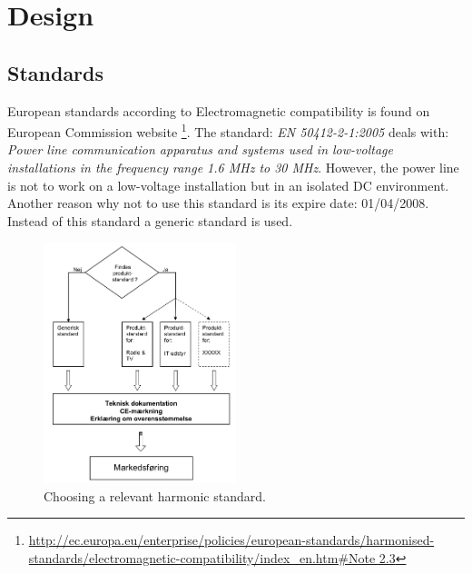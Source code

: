 \chapter{Design}
\section{Standards}
European standards according to Electromagnetic compatibility is found on European Commission website \footnote{\url{http://ec.europa.eu/enterprise/policies/european-standards/harmonised-standards/electromagnetic-compatibility/index\_en.htm\#Note 2.3}}.
The standard: \textit{EN 50412-2-1:2005} deals with: \textit{Power line communication apparatus and systems used in low-voltage installations in the frequency range 1.6 MHz to 30 MHz}. However, the power line is not to work on a low-voltage installation but in an isolated DC environment. Another reason why not to use this standard is its expire date: 01/04/2008. Instead of this standard a generic standard is used.

\begin{figure}[H]
	\begin{centering}
		 \includegraphics[width=0.5\textwidth]{images/choose_hormonic_standard.png}
		\caption{Choosing a relevant harmonic standard.}
	\end{centering}
\end{figure}
